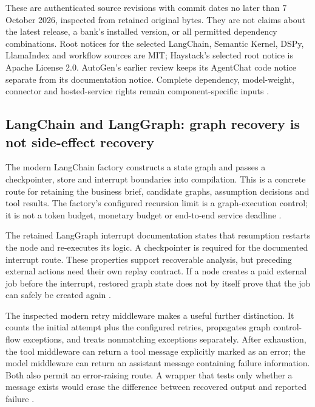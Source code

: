 These are authenticated source revisions with commit dates no later than
7 October 2026, inspected from retained original bytes. They are not
claims about the latest release, a bank's installed version, or all
permitted dependency combinations. Root notices for the selected
LangChain, Semantic Kernel, DSPy, LlamaIndex and workflow sources are MIT;
Haystack's selected root notice is Apache License 2.0. AutoGen's earlier
review keeps its AgentChat code notice separate from its documentation
notice. Complete dependency, model-weight, connector and hosted-service
rights remain component-specific inputs
\citep{exec24_framework_langchain,exec24_framework_semantic_kernel,
exec24_framework_dspy,exec24_framework_llama_index,
exec24_framework_haystack,exec24_framework_workflows,v12_la04_autogen}.

\subsection{LangChain and LangGraph: graph recovery is not side-effect recovery}
The modern LangChain factory constructs a state graph and passes a
checkpointer, store and interrupt boundaries into compilation. This is
a concrete route for retaining the business brief, candidate graphs,
assumption decisions and tool results. The factory's configured recursion
limit is a graph-execution control; it is not a token budget, monetary
budget or end-to-end service deadline
\citep{exec24_framework_langchain}.

The retained LangGraph interrupt documentation states that resumption
restarts the node and re-executes its logic. A checkpointer is required
for the documented interrupt route. These properties support recoverable
analysis, but preceding external actions need their own replay contract.
If a node creates a paid external job before the interrupt, restored graph
state does not by itself prove that the job can safely be created again
\citep{v12_la04_langgraph,exec24_framework_contracts}.

The inspected modern retry middleware makes a useful further distinction.
It counts the initial attempt plus the configured retries, propagates
graph control-flow exceptions, and treats nonmatching exceptions separately.
After exhaustion, the tool middleware can return a tool message explicitly
marked as an error; the model middleware can return an assistant message
containing failure information. Both also permit an error-raising route.
A wrapper that tests only whether a message exists would erase the
difference between recovered output and reported failure
\citep{exec24_framework_langchain}.

